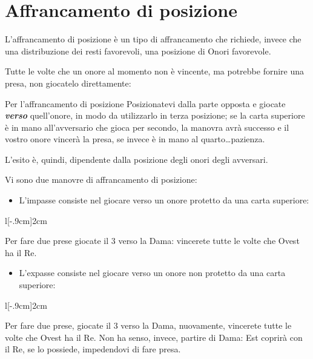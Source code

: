 \documentclass[../corsofiori.tex]{subfiles}
\begin{document}
\newpage

\section{Affrancamento di posizione}

L'affrancamento di posizione è un tipo di affrancamento che richiede, invece che una distribuzione dei resti favorevoli,
una posizione di Onori favorevole.

Tutte le volte che un onore al momento non è vincente, ma potrebbe fornire una presa, non giocatelo direttamente:

\medskip
\begin{regola}{Per l'affrancamento di posizione}
 Posizionatevi dalla parte opposta e giocate \emph{\textbf{verso}} quell'onore, in modo da utilizzarlo in terza
posizione; se la carta superiore è in mano all'avversario che gioca per secondo, la manovra avrà successo e il vostro
onore vincerà la presa, se invece è in mano al quarto\ldots pazienza.
\end{regola}
\medskip

L'esito è, quindi, dipendente dalla posizione degli onori degli avversari.

Vi sono due manovre di affrancamento di posizione:

\begin{itemize}
    \item L'impasse consiste nel giocare verso un onore protetto da una carta superiore:
\end{itemize}

\begin{wraptable}[2]{l}[-.9cm]{2cm}
    \vspace{-1.0cm}
\end{wraptable}

        Per fare due prese giocate il 3 verso la Dama: vincerete tutte le volte che Ovest ha il Re.

\begin{itemize}
    \item L'expasse consiste nel giocare verso un onore non protetto da una carta superiore:
\end{itemize}

\begin{wraptable}[4]{l}[-.9cm]{2cm}
    \vspace{-1.0cm}
\end{wraptable}

Per fare due prese, giocate il 3 verso la Dama, nuovamente, vincerete tutte le volte che Ovest ha il Re. Non ha senso,
invece, partire di Dama: Est coprirà con il Re, se lo possiede, impedendovi di fare presa.
\end{document}
